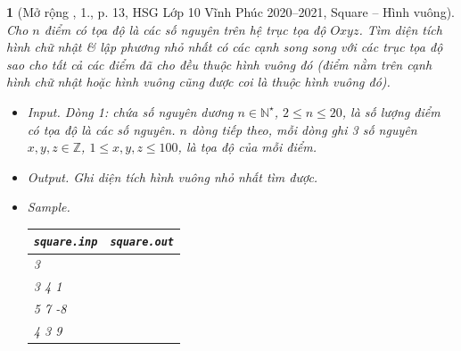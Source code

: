 \documentclass{article}
\newtheorem{baitoan}{}
\begin{document}
\begin{baitoan}[Mở rộng \cite{Trung_HSG_THPT_Tin}, 1., p. 13, HSG Lớp 10 Vĩnh Phúc 2020--2021, Square -- Hình vuông]
	Cho $n$ điểm có tọa độ là các số nguyên trên hệ trục tọa độ $Oxyz$. Tìm diện tích hình chữ nhật \& lập phương nhỏ nhất có các cạnh song song với các trục tọa độ sao cho tất cả các điểm đã cho đều thuộc hình vuông đó (điểm nằm trên cạnh hình chữ nhật hoặc hình vuông cũng được coi là thuộc hình vuông đó).
	\begin{itemize}
		\item {\sf Input.} Dòng 1: chứa số nguyên dương $n\in\mathbb{N}^\star$, $2\le n\le20$, là số lượng điểm có tọa độ là các số nguyên. $n$ dòng tiếp theo, mỗi dòng ghi 3 số nguyên $x,y,z\in\mathbb{Z}$, $1\le x,y,z\le100$, là tọa độ của mỗi điểm.
		\item {\sf Output.} Ghi diện tích hình vuông nhỏ nhất tìm được.
		\item {\sf Sample.}
		\begin{table}[H]
			\centering
			\begin{tabular}{|l|l|}
				\hline
				{\tt square.inp} & {\tt square.out} \\
				\hline
				3 &  \\
				3 4 1 &  \\
				5 7 -8 &  \\
				4 3 9 &  \\
				\hline
			\end{tabular}
		\end{table}
	\end{itemize}
\end{baitoan}
\end{document}
